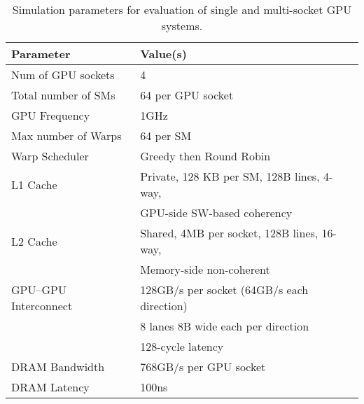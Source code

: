 \begin{table}[tp]
\begin{small}
\centering
\begin{tabular}{ll}
\toprule
\textbf{Parameter} & \textbf{Value(s)} \\
\toprule
Num of GPU sockets & 4 \\
\midrule
Total number of SMs & 64 per GPU socket \\
\midrule
GPU Frequency & 1GHz \\
\midrule
Max number of Warps & 64 per SM \\
\midrule
Warp Scheduler & Greedy then Round Robin \\
\midrule
L1 Cache & Private, 128 KB per SM, 128B lines, 4-way, \\ 
& GPU-side SW-based coherency \\
\midrule
L2 Cache & Shared, 4MB per socket, 128B lines, 16-way, \\ 
& Memory-side non-coherent\\
\midrule
GPU--GPU Interconnect & 128GB/s per socket (64GB/s each direction) \\
& 8 lanes 8B wide each per direction \\
&128-cycle latency \\
\midrule
DRAM Bandwidth & 768GB/s per GPU socket\\
\midrule
DRAM Latency & 100ns \\
\toprule
\end{tabular}
\vspace{-.1in}
\caption{Simulation parameters for evaluation of single and multi-socket GPU 
systems.}
\vspace{-.2in}
\label{tab:setup}
\end{small}
\end{table} 


